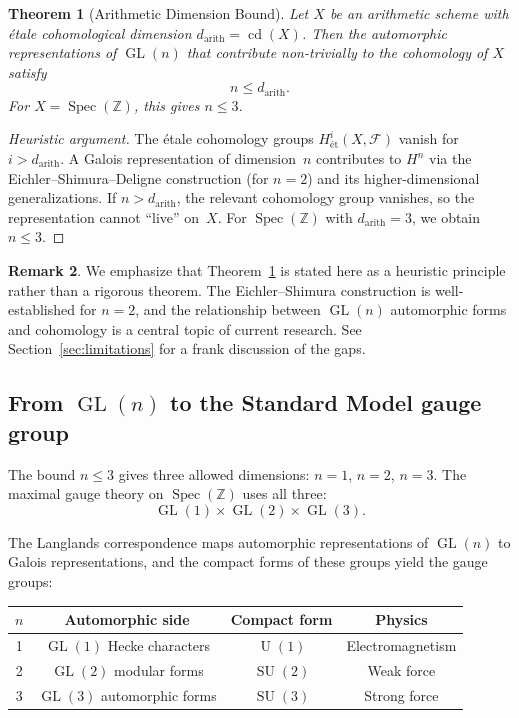 \documentclass[12pt,a4paper]{article}
\newtheorem{theorem}{Theorem}[section]
\theoremstyle{definition}
\newtheorem{remark}[theorem]{Remark}
\newcommand{\Spec}{\operatorname{Spec}}
\newcommand{\GL}{\operatorname{GL}}
\newcommand{\SU}{\operatorname{SU}}
\newcommand{\cd}{\operatorname{cd}}
\newcommand{\Z}{\mathbb{Z}}
\newcommand{\U}{\operatorname{U}}
\begin{document}
\begin{theorem}[Arithmetic Dimension Bound]\label{thm:gauge_bound}
Let $X$ be an arithmetic scheme with \'etale cohomological
dimension $d_{\mathrm{arith}} = \cd(X)$.
Then the automorphic representations of $\GL(n)$ that contribute
non-trivially to the cohomology of $X$ satisfy
\[
  n \le d_{\mathrm{arith}}.
\]
For $X = \Spec(\Z)$, this gives $n \le 3$.
\end{theorem}

\begin{proof}[Heuristic argument]
The \'etale cohomology groups $H^i_{\text{\'et}}(X,\mathscr{F})$
vanish for $i > d_{\mathrm{arith}}$.
A Galois representation of dimension~$n$ contributes to
$H^n$ via the Eichler--Shimura--Deligne construction (for $n=2$)
and its higher-dimensional generalizations.
If $n > d_{\mathrm{arith}}$, the relevant cohomology group vanishes,
so the representation cannot ``live'' on~$X$.
For $\Spec(\Z)$ with $d_{\mathrm{arith}}=3$, we obtain $n \le 3$.
\end{proof}

\begin{remark}
We emphasize that Theorem~\ref{thm:gauge_bound} is stated here as
a heuristic principle rather than a rigorous theorem.
The Eichler--Shimura construction is well-established for $n=2$,
and the relationship between $\GL(n)$ automorphic forms and
cohomology is a central topic of current research.
See Section~\ref{sec:limitations} for a frank discussion
of the gaps.
\end{remark}

\subsection{From $\GL(n)$ to the Standard Model gauge group}

The bound $n \le 3$ gives three allowed dimensions:
$n=1$, $n=2$, $n=3$.
The maximal gauge theory on $\Spec(\Z)$ uses all three:
\begin{equation}\label{eq:GL_product}
  \GL(1) \times \GL(2) \times \GL(3).
\end{equation}

The Langlands correspondence maps automorphic representations
of $\GL(n)$ to Galois representations, and the compact forms
of these groups yield the gauge groups:

\begin{center}
\begin{tabular}{cccc}
\toprule
$n$ & Automorphic side & Compact form & Physics \\
\midrule
1 & $\GL(1)$ Hecke characters & $\U(1)$ & Electromagnetism \\
2 & $\GL(2)$ modular forms & $\SU(2)$ & Weak force \\
3 & $\GL(3)$ automorphic forms & $\SU(3)$ & Strong force \\
\bottomrule
\end{tabular}
\end{center}
\end{document}
